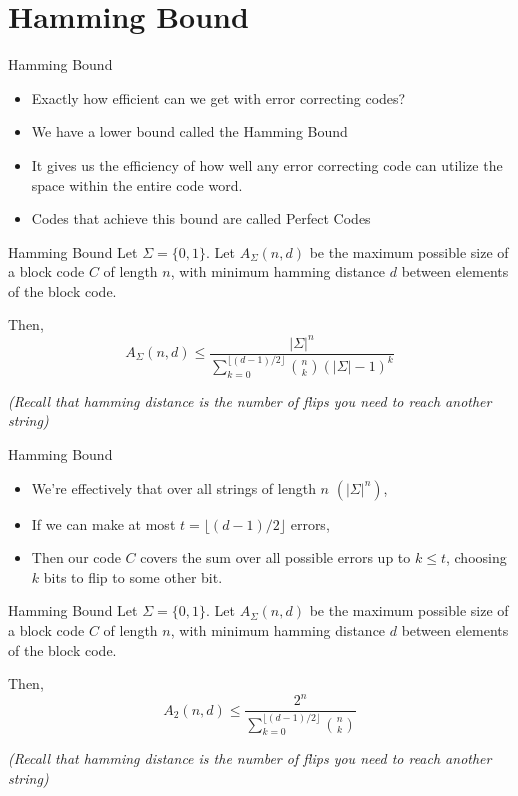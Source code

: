 \documentclass[aspectratio=169, handout]{beamer}
\makeatletter
\newcommand{\blu}[1]{{\color{sigma@mainblue}#1}}
\makeatother
\begin{document}
\section{Hamming Bound}

\frame{\sectionpage}

\begin{frame}{Hamming Bound}
    \begin{itemize}
        \item Exactly how efficient can we get with error correcting codes? \pause
        \item We have a lower bound called the {\color{sigma@mainblue}Hamming Bound} \pause
        \item It gives us the efficiency of how well any error correcting code can utilize the space within the entire code word. \pause
        \item Codes that achieve this bound are called \blu{Perfect Codes}
    \end{itemize}
\end{frame}

\begin{frame}{Hamming Bound}
    Let $\Sigma = \{0,1\}$. Let $A_\Sigma(n,d)$ be the maximum possible size of a block code $C$ of length $n$, with minimum hamming distance $d$ between elements of the block code.

    Then,
    $$A_\Sigma(n,d) \leq \frac{|\Sigma|^n}{\sum\limits_{k=0}^{\lfloor (d-1)/2\rfloor} \binom{n}{k}(|\Sigma|-1)^k}$$

    \textit{(Recall that hamming distance is the number of flips you need to reach another string)}
\end{frame}

\begin{frame}{Hamming Bound}
    \begin{itemize}
        \item We're effectively that over all strings of length $n$ $(|\Sigma|^n)$,\pause
        \item If we can make at most $t=\lfloor(d-1)/2\rfloor$ errors, \pause
        \item Then our code $C$ covers the sum over all possible errors up to $k\leq t$, choosing $k$ bits to flip to some other bit. 
    \end{itemize}
\end{frame}

\begin{frame}{Hamming Bound}
    Let $\Sigma = \{0,1\}$. Let $A_\Sigma(n,d)$ be the maximum possible size of a block code $C$ of length $n$, with minimum hamming distance $d$ between elements of the block code.

    Then,
    $$A_2(n,d) \leq \frac{2^n}{\sum\limits_{k=0}^{\lfloor (d-1)/2\rfloor} \binom{n}{k}}$$

    \textit{(Recall that hamming distance is the number of flips you need to reach another string)}
\end{frame}
\end{document}
